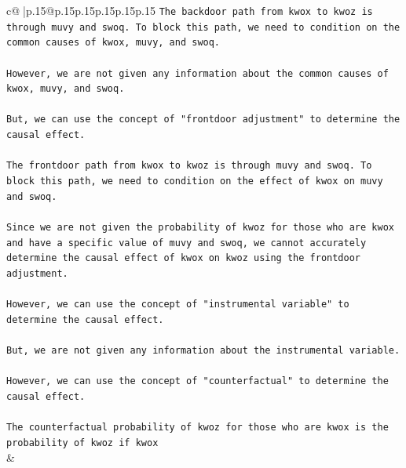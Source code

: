 \documentclass{article}
\begin{document}
{\begin{supertabular}{c@{$\;$}|p{.15\linewidth}@{}p{.15\linewidth}p{.15\linewidth}p{.15\linewidth}p{.15\linewidth}p{.15\linewidth}}
{{{\texttt{The backdoor path from kwox to kwoz is through muvy and swoq. To block this path, we need to condition on the common causes of kwox, muvy, and swoq. } \\
\\ 
\texttt{However, we are not given any information about the common causes of kwox, muvy, and swoq. } \\
\\ 
\texttt{But, we can use the concept of "frontdoor adjustment" to determine the causal effect. } \\
\\ 
\texttt{The frontdoor path from kwox to kwoz is through muvy and swoq. To block this path, we need to condition on the effect of kwox on muvy and swoq.} \\
\\ 
\texttt{Since we are not given the probability of kwoz for those who are kwox and have a specific value of muvy and swoq, we cannot accurately determine the causal effect of kwox on kwoz using the frontdoor adjustment.} \\
\\ 
\texttt{However, we can use the concept of "instrumental variable" to determine the causal effect. } \\
\\ 
\texttt{But, we are not given any information about the instrumental variable.} \\
\\ 
\texttt{However, we can use the concept of "counterfactual" to determine the causal effect. } \\
\\ 
\texttt{The counterfactual probability of kwoz for those who are kwox is the probability of kwoz if kwox} \\
            }
        }
    }
    & \\ \\


\end{supertabular}}
\end{document}
